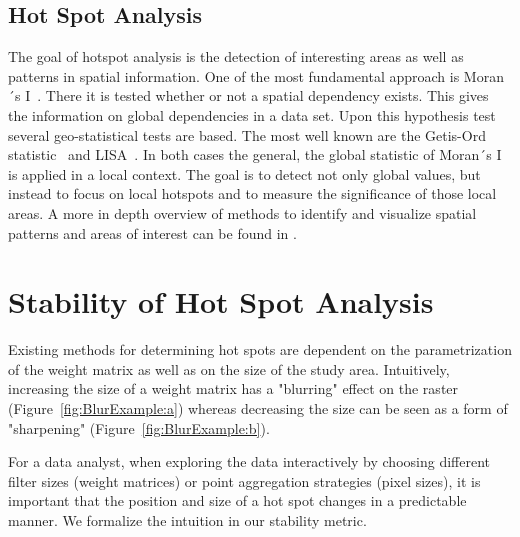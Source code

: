 \documentclass{itatnew}
\begin{document}
\subsection{Hot Spot Analysis}
The goal of hotspot analysis is the detection of interesting areas as well as patterns in spatial information. One of the most fundamental approach is Moran´s I~\cite{MoranI}. There it is tested whether or
not a spatial dependency exists. This gives the information on global
dependencies in a data set. Upon this hypothesis test several geo-statistical
tests are based. The most well known are the Getis-Ord statistic~\cite{Ord.1995}
and LISA~\cite{Anselin.1995}. In both cases the general, the global statistic of
Moran´s I is applied in a local context. The goal is to detect not only global
values, but instead to focus on local hotspots and to measure the significance
of those local areas. A more in depth overview of methods to identify and visualize spatial patterns and areas of interest can be found in \cite{shekhar2011identifying}. 

\section{Stability of Hot Spot Analysis}
\label{sec:Metric}

Existing methods for determining hot spots are dependent on the parametrization
of the weight matrix as well as on the size of the study area. Intuitively,
increasing the size of a weight matrix has a "blurring" effect on the raster
(Figure~\ref{fig:BlurExample:a}) whereas decreasing the size can be 
seen as a form of "sharpening" (Figure~\ref{fig:BlurExample:b}).



For a data analyst, when exploring the data interactively by choosing different
filter sizes (weight matrices) or point aggregation strategies (pixel sizes), it
is important that the position and size of a hot spot changes in a predictable
manner. We formalize the intuition in our stability metric.
\end{document}
